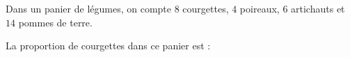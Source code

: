 
Dans un panier de légumes, on compte $8$ courgettes, $4$ poireaux, $6$ artichauts et $14$ pommes de terre.

La proportion de courgettes dans ce panier est :

\smallskip
{}
